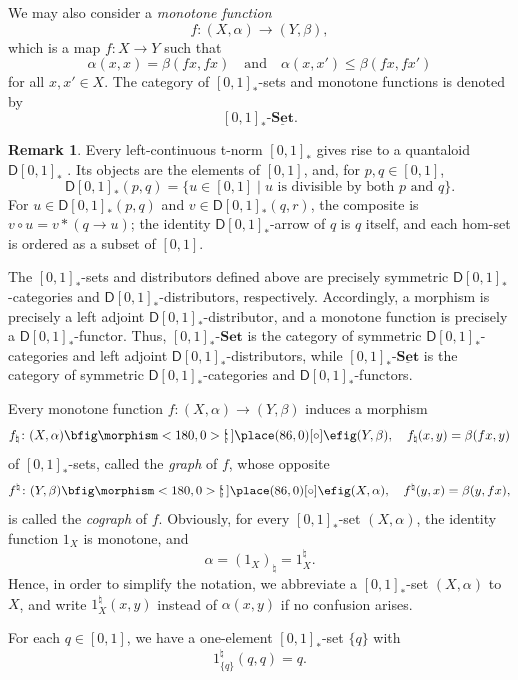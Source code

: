 \documentclass{birkau}
\theoremstyle{plain}
\theoremstyle{definition}
\newtheorem{rem}[thm]{Remark}
\def\oto{{\bfig\morphism<180,0>[\mkern-4mu`\mkern-4mu;]\place(86,0)[\circ]\efig}}
\newcommand{\ra}{\rightarrow}
\newcommand{\nat}{\natural}
\newcommand{\al}{\alpha}
\newcommand{\be}{\beta}
\newcommand{\sD}{\mathsf{D}}
\newcommand{\Set}{\mathbf{Set}}
\newcommand{\RSet}{[0,1]_*\text{-}\Set}
\newcommand{\RSetM}{[0,1]_*\text{-}\underline{\Set}}
\renewcommand{\leq}{\leqslant}
\numberwithin{equation}{section}
\begin{document}
We may also consider a \emph{monotone function}
\[f\colon(X,\al)\to(Y,\be),\]
which is a map $f\colon X\to Y$ such that
\begin{equation} \label{monotone-function-def}
\al(x,x)=\be(fx,fx)\quad\text{and}\quad\al(x,x')\leq\be(fx,fx')
\end{equation}
for all $x,x'\in X$. The category of $[0,1]_*$-sets and monotone functions is denoted by
\[\RSetM.\]

\begin{rem}
Every left-continuous t-norm $[0,1]_*$ gives rise to a quantaloid $\sD[0,1]_*$ \cite{Hoehle2011,Pu2012,Stubbe2014,Lai2020}. Its objects are the elements of $[0,1]$, and, for $p,q\in[0,1]$,
\[\sD[0,1]_*(p,q)=\{u\in[0,1]\mid u\text{ is divisible by both }p\text{ and }q\}.\]
For $u\in\sD[0,1]_*(p,q)$ and $v\in\sD[0,1]_*(q,r)$, the composite is $v\circ u=v*(q\ra u)$; the identity $\sD[0,1]_*$-arrow of $q$ is $q$ itself, and each hom-set is ordered as a subset of $[0,1]$.

The $[0,1]_*$-sets and distributors defined above are precisely symmetric $\sD[0,1]_*$-categories and $\sD[0,1]_*$-distributors, respectively. Accordingly, a morphism is precisely a left adjoint $\sD[0,1]_*$-distributor, and a monotone function is precisely a $\sD[0,1]_*$-functor. Thus, $\RSet$ is the category of symmetric $\sD[0,1]_*$-categories and left adjoint $\sD[0,1]_*$-distributors, while $\RSetM$ is the category of symmetric $\sD[0,1]_*$-categories and $\sD[0,1]_*$-functors.
\end{rem}

Every monotone function $f\colon(X,\al)\to(Y,\be)$ induces a morphism 
\begin{equation} \label{f-graph-def}
f_{\nat}\colon(X,\al)\oto(Y,\be),\quad f_{\nat}(x,y)=\be(fx,y)
\end{equation}
of $[0,1]_*$-sets, called the \emph{graph} of $f$, whose opposite
\[f^{\nat}\colon(Y,\be)\oto(X,\al),\quad f^{\nat}(y,x)=\be(y,fx),\]
is called the \emph{cograph} of $f$. Obviously, for every $[0,1]_*$-set $(X,\al)$, the identity function $1_X$ is monotone, and
\[\al=(1_X)_{\nat}=1_X^{\nat}.\]
Hence, in order to simplify the notation, we abbreviate a $[0,1]_*$-set $(X,\al)$ to $X$, and write $1_X^{\nat}(x,y)$ instead of $\al(x,y)$ if no confusion arises. 

For each $q\in[0,1]$, we have a one-element $[0,1]_*$-set $\{q\}$ with 
\[1_{\{q\}}^{\nat}(q,q)=q.\]
\end{document}
